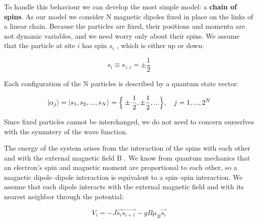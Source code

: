 \documentclass[12pt]{article}
\theoremstyle{plain}
\begin{document}
\vspace{2mm}

\par To handle this behaviour we can develop the most simple model: a \textbf{chain of spins}. As our model
we consider N magnetic dipoles fixed in place on the links of a linear chain. Because
the particles are fixed, their positions and momenta are not dynamic variables, and we need
worry only about their spins. We assume that the particle at site $i$ has spin $s_{i}$ , which is either
up or down:

\vspace{2mm}

\begin{equation*}
    s_{i} \equiv s_{z, i} = \pm \frac{1}{2}
\end{equation*}

\vspace{2mm}

\par Each configuration of the N particles is described by a quantum state vector:

\vspace{2mm}

\begin{equation*}
    \ket{\alpha_{j}} = \ket{s_1, s_2, ..., s_N} = \Big\{ \pm \frac{1}{2}, \pm \frac{1}{2}, ...\Big\}, \quad j = 1, ..., 2^{N}
\end{equation*}

\vspace{2mm}

\par Since fixed particles cannot be interchanged, we do not need to concern
ourserlves with the symmtery of the wave function.

\vspace{2mm}

\par The energy of the system arises from the interaction of the spins with each other and
with the external magnetic field B . We know from quantum mechanics that an electron’s spin
and magnetic moment are proportional to each other, so a magnetic dipole–dipole interaction
is equivalent to a spin–spin interaction. We assume that each dipole interacts with the external
magnetic field and with its nearest neighbor through the potential:

\vspace{2mm}

\begin{equation*}
    V_{i} = -J\vec{s_{i}}\vec{s_{i+1}} - g B\mu_{B}\vec{s_i}
\end{equation*}
\end{document}
